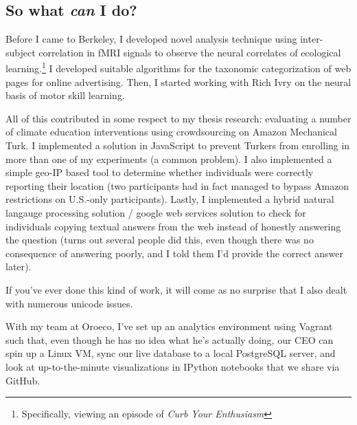 \subsection*{So what \emph{can} I do?}


Before I came to Berkeley, I developed novel analysis technique using
inter-subject correlation in fMRI signals to observe the neural correlates of
ecological learning.\footnote{Specifically, viewing an episode of \emph{Curb
Your Enthusiasm}} I developed suitable algorithms for the taxonomic
categorization of web pages for online advertising. Then, I started working with
Rich Ivry on the neural basis of motor skill learning.

All of this contributed in some respect to my thesis research: evaluating a
number of climate education interventions using crowdsourcing on Amazon
Mechanical Turk. I implemented a solution in JavaScript to prevent Turkers from
enrolling in more than one of my experiments (a common problem). %
I also implemented a simple geo-IP based tool to determine whether individuals
were correctly reporting their location (two participants had in fact managed to
bypass Amazon restrictions on U.S.-only participants). Lastly, I implemented a
hybrid natural langauge processing solution / google web services solution to
check for individuals copying textual answers from the web instead of honestly
answering the question (turns out several people did this, even though there was
no consequence of answering poorly, and I told them I'd provide the correct
answer later).

If you've ever done this kind of work, it will come as no surprise that I also
dealt with numerous unicode issues.

With my team at Oroeco, I've set up an analytics environment using Vagrant such
that, even though he has no idea what he's actually doing, our CEO can spin up a
Linux VM, sync our live database to a local PostgreSQL server, and look at
up-to-the-minute visualizations in IPython notebooks that we share via GitHub.



